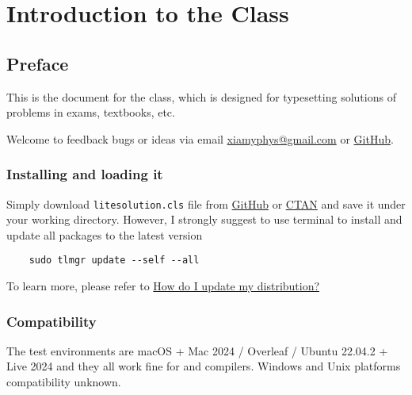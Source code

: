 \documentclass[mtpro2,twoside,openany]{litesolution}
\begin{document}
\maketitle

\frontmatter
\tableofcontents
\mainmatter


\chapter{Introduction to the  Class}

\section{Preface}

This is the document for the  class, which is designed for typesetting solutions of problems in exams, textbooks, etc.

Welcome to feedback bugs or ideas via email \href{mailto:xiamyphys@gmail.com}{\ttfamily xiamyphys@gmail.com} or \href{https://github.com/xiamyphys/litesolution}{GitHub}.

\subsection{Installing  and loading it}

Simply download \verb|litesolution.cls| file from \href{https://github.com/xiamyphys/litesolution}{GitHub} or \href{https://ctan.org/pkg/litesolution}{CTAN} and save it under your working directory. However, I strongly suggest to use terminal to install and update all packages to the latest version

\begin{verbatim}
    sudo tlmgr update --self --all
\end{verbatim}

To learn more, please refer to \href{https://tex.stackexchange.com/questions/55437/how-do-i-update-my-tex-distribution}{How do I update my  distribution?}

\subsection{Compatibility}

The test environments are macOS + Mac 2024 / Overleaf / Ubuntu 22.04.2 +  Live 2024 and they all work fine for  and  compilers. Windows and Unix platforms compatibility unknown.
\end{document}

